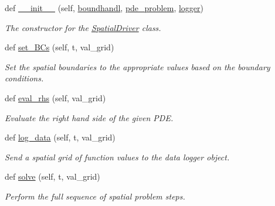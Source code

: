 \begin{DoxyCompactItemize}
\item 
def \hyperlink{classMain__PDE__Repo_1_1src_1_1spatial__driver_1_1SpatialDriver_a7e08a0ce817760d8ea8c4e146ab1a82d}{\+\_\+\+\_\+init\+\_\+\+\_\+} (self, \hyperlink{classMain__PDE__Repo_1_1src_1_1spatial__driver_1_1SpatialDriver_a8e4da2dd5010a3f8e63f2a6aa28ffabf}{boundhandl}, \hyperlink{classMain__PDE__Repo_1_1src_1_1spatial__driver_1_1SpatialDriver_a2a61190d268b74c9388d3bbe3e3cce93}{pde\+\_\+problem}, \hyperlink{classMain__PDE__Repo_1_1src_1_1spatial__driver_1_1SpatialDriver_aac2299eb18270b9cc3c17d2d07e0dc57}{logger})
\begin{DoxyCompactList}\small\item\em The constructor for the \hyperlink{classMain__PDE__Repo_1_1src_1_1spatial__driver_1_1SpatialDriver}{Spatial\+Driver} class. \end{DoxyCompactList}\item 
def \hyperlink{classMain__PDE__Repo_1_1src_1_1spatial__driver_1_1SpatialDriver_a8383df7f86b0bca04a6787290438cde7}{set\+\_\+\+B\+Cs} (self, t, val\+\_\+grid)
\begin{DoxyCompactList}\small\item\em Set the spatial boundaries to the appropriate values based on the boundary conditions. \end{DoxyCompactList}\item 
def \hyperlink{classMain__PDE__Repo_1_1src_1_1spatial__driver_1_1SpatialDriver_afcf6ad549e5939c1eb267144b26d2042}{eval\+\_\+rhs} (self, val\+\_\+grid)
\begin{DoxyCompactList}\small\item\em Evaluate the right hand side of the given P\+DE. \end{DoxyCompactList}\item 
def \hyperlink{classMain__PDE__Repo_1_1src_1_1spatial__driver_1_1SpatialDriver_ace8ab1e2e0d8e9da601ecddf44d504c2}{log\+\_\+data} (self, t, val\+\_\+grid)
\begin{DoxyCompactList}\small\item\em Send a spatial grid of function values to the data logger object. \end{DoxyCompactList}\item 
def \hyperlink{classMain__PDE__Repo_1_1src_1_1spatial__driver_1_1SpatialDriver_ada0ed39211b437d2f86b9b103a690eb3}{solve} (self, t, val\+\_\+grid)
\begin{DoxyCompactList}\small\item\em Perform the full sequence of spatial problem steps. \end{DoxyCompactList}\end{DoxyCompactItemize}
